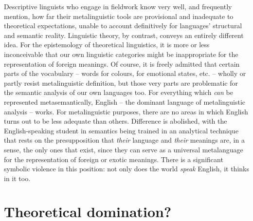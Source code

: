 \documentclass[output=paper]{langscibook}
\begin{document}
Descriptive linguists who engage in fieldwork know very well, and frequently mention, how far their metalinguistic tools are provisional and inadequate to theoretical expectations, unable to account definitively for languages' structural and semantic reality. Linguistic theory, by contrast, conveys an entirely different idea. For the epistemology of theoretical linguistics, it is more or less inconceivable that our own linguistic categories might be inappropriate for the representation of foreign meanings. Of course, it is freely admitted that certain parts of the vocabulary -- words for colours, for emotional states, etc. -- wholly or partly resist metalinguistic definition, but those very parts are problematic for the semantic analysis of our own languages too.  For everything which \emph{can} be represented metasemantically, English -- the dominant language of metalinguistic analysis -- works. For metalinguistic purposes, there are no areas in which English turns out to be less adequate than others. Difference is abolished, with the English-speaking student in semantics being trained in an analytical technique that rests on the presupposition that \emph{their} language and \emph{their} meanings are, in a sense, the only ones that exist, since they can serve as a universal metalanguage for the representation of foreign or exotic meanings. There is a significant symbolic violence in this position: not only does the world \emph{speak} English, it thinks in it too.

\section{Theoretical domination?}
\label{sec:riemer:theoreticaldomination}
\end{document}
